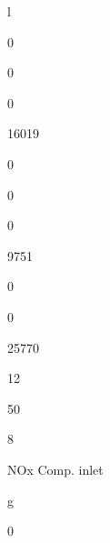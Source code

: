 \documentclass[a4paper,portrait,12pt]{article}
\begin{document}
\begin{flushleft}
l
\end{flushleft}





0





0





0





16019





0





0





0





9751





0





0





25770





12





50





8





\begin{flushleft}
NOx Comp. inlet
\end{flushleft}





\begin{flushleft}
g
\end{flushleft}





0
\end{document}
